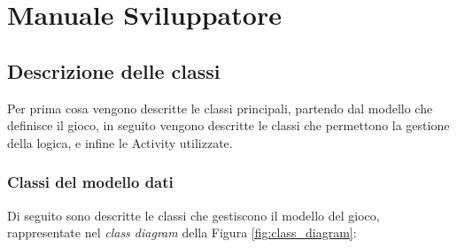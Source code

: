 \renewcommand*{\mypath}{trovaintruso1}%
\graphicspath{ {\mypath/images/} }

\localtoc

\section{Manuale Sviluppatore}

\subsection{Descrizione delle classi}

\noindent Per prima cosa vengono descritte le classi principali, partendo dal modello che definisce il gioco, in seguito vengono descritte le classi  che permettono la gestione della logica, e infine le Activity utilizzate.

\subsubsection{Classi del modello dati}

\noindent Di seguito sono descritte le classi che gestiscono il modello del gioco, rappresentate nel \textit{class diagram} della Figura \ref{fig:class_diagram}:

